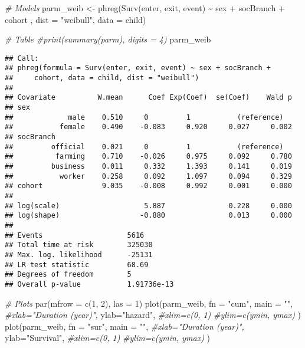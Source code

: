 \documentclass[
]{book}
\newenvironment{Shaded}{\begin{snugshade}}{\end{snugshade}}
\newcommand{\AttributeTok}[1]{\textcolor[rgb]{0.77,0.63,0.00}{#1}}
\newcommand{\CommentTok}[1]{\textcolor[rgb]{0.56,0.35,0.01}{\textit{#1}}}
\newcommand{\DecValTok}[1]{\textcolor[rgb]{0.00,0.00,0.81}{#1}}
\newcommand{\FunctionTok}[1]{\textcolor[rgb]{0.00,0.00,0.00}{#1}}
\newcommand{\NormalTok}[1]{#1}
\newcommand{\OtherTok}[1]{\textcolor[rgb]{0.56,0.35,0.01}{#1}}
\newcommand{\SpecialCharTok}[1]{\textcolor[rgb]{0.00,0.00,0.00}{#1}}
\newcommand{\StringTok}[1]{\textcolor[rgb]{0.31,0.60,0.02}{#1}}
\begin{document}
\begin{Shaded}
\begin{Highlighting}[]
\CommentTok{\# Models}
\NormalTok{parm\_weib }\OtherTok{\textless{}{-}} \FunctionTok{phreg}\NormalTok{(}\FunctionTok{Surv}\NormalTok{(enter, exit, event) }\SpecialCharTok{\textasciitilde{}}\NormalTok{ sex }\SpecialCharTok{+}\NormalTok{ socBranch }\SpecialCharTok{+}\NormalTok{ cohort , }
              \AttributeTok{dist =} \StringTok{"weibull"}\NormalTok{,}
              \AttributeTok{data =}\NormalTok{ child)}

\CommentTok{\# Table}
\CommentTok{\#print(summary(parm), digits = 4)}
\NormalTok{parm\_weib}
\end{Highlighting}
\end{Shaded}

\begin{verbatim}
## Call:
## phreg(formula = Surv(enter, exit, event) ~ sex + socBranch + 
##     cohort, data = child, dist = "weibull")
## 
## Covariate          W.mean      Coef Exp(Coef)  se(Coef)    Wald p
## sex 
##             male    0.510     0         1           (reference)
##           female    0.490    -0.083     0.920     0.027     0.002 
## socBranch 
##         official    0.021     0         1           (reference)
##          farming    0.710    -0.026     0.975     0.092     0.780 
##         business    0.011     0.332     1.393     0.141     0.019 
##           worker    0.258     0.092     1.097     0.094     0.329 
## cohort              9.035    -0.008     0.992     0.001     0.000 
## 
## log(scale)                    5.887               0.228     0.000 
## log(shape)                   -0.880               0.013     0.000 
## 
## Events                    5616 
## Total time at risk        325030 
## Max. log. likelihood      -25131 
## LR test statistic         68.69 
## Degrees of freedom        5 
## Overall p-value           1.91736e-13
\end{verbatim}

\begin{Shaded}
\begin{Highlighting}[]
\CommentTok{\# Plots}
\FunctionTok{par}\NormalTok{(}\AttributeTok{mfrow =} \FunctionTok{c}\NormalTok{(}\DecValTok{1}\NormalTok{, }\DecValTok{2}\NormalTok{), }\AttributeTok{las =} \DecValTok{1}\NormalTok{)}
\FunctionTok{plot}\NormalTok{(parm\_weib, }
     \AttributeTok{fn =} \StringTok{"cum"}\NormalTok{, }\AttributeTok{main =} \StringTok{""}\NormalTok{, }
     \CommentTok{\#xlab="Duration (year)", }
     \AttributeTok{ylab=}\StringTok{"hazard"}\NormalTok{,}
     \CommentTok{\#xlim=c(0, 1) }
     \CommentTok{\#ylim=c(ymin, ymax)}
\NormalTok{     )}
\FunctionTok{plot}\NormalTok{(parm\_weib, }
     \AttributeTok{fn =} \StringTok{"sur"}\NormalTok{, }\AttributeTok{main =} \StringTok{""}\NormalTok{, }
     \CommentTok{\#xlab="Duration (year)", }
     \AttributeTok{ylab=}\StringTok{"Survival"}\NormalTok{,}
     \CommentTok{\#xlim=c(0, 1) }
     \CommentTok{\#ylim=c(ymin, ymax)}
\NormalTok{     )}
\end{Highlighting}
\end{Shaded}
\end{document}

